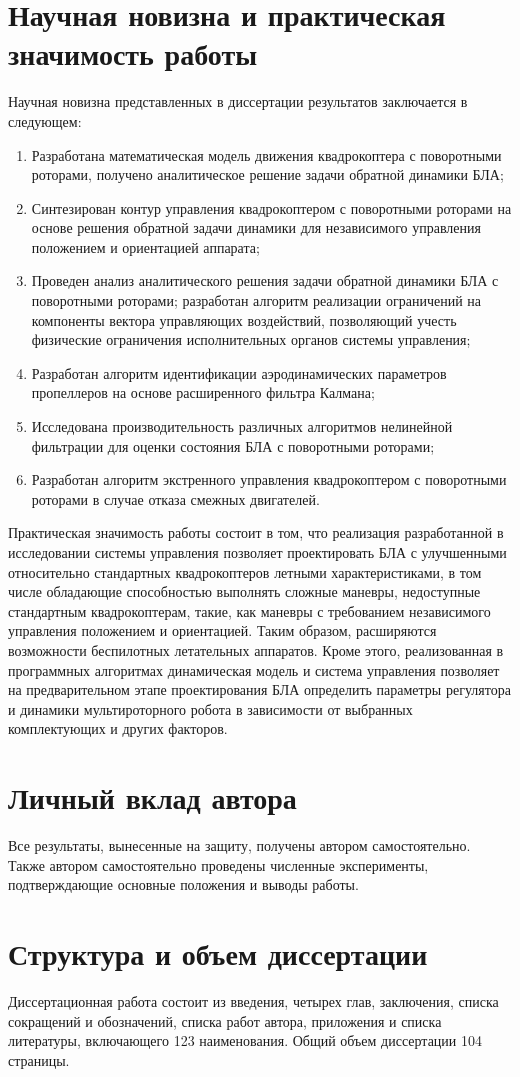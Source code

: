 \section{Научная новизна и практическая значимость работы}
Научная новизна представленных в диссертации результатов заключается в следующем:
\begin{enumerate}
	\item  Разработана математическая модель движения квадрокоптера с поворотными роторами, получено аналитическое решение задачи обратной динамики БЛА;
	\item Синтезирован контур управления квадрокоптером с поворотными роторами на основе решения обратной задачи динамики для независимого управления положением и ориентацией аппарата;
	\item  Проведен анализ аналитического решения задачи обратной динамики  БЛА с поворотными роторами; разработан алгоритм реализации ограничений на компоненты вектора управляющих воздействий, позволяющий учесть физические ограничения исполнительных органов системы управления;
	\item Разработан алгоритм идентификации аэродинамических параметров пропеллеров на основе расширенного фильтра Калмана;
	\item Исследована производительность различных алгоритмов нелинейной фильтрации для оценки состояния БЛА с поворотными роторами;
	\item Разработан алгоритм экстренного управления квадрокоптером с поворотными роторами в случае отказа  смежных двигателей.
\end{enumerate}

Практическая значимость работы состоит в том, что
реализация разработанной в исследовании системы управления позволяет проектировать БЛА с улучшенными относительно стандартных квадрокоптеров летными характеристиками, в том числе обладающие способностью 
выполнять сложные маневры, недоступные стандартным квадрокоптерам, такие, как маневры с требованием независимого управления положением и ориентацией.
Таким образом, расширяются возможности беспилотных летательных аппаратов.
Кроме этого, реализованная в программных алгоритмах динамическая модель и система управления позволяет на предварительном этапе проектирования БЛА определить параметры регулятора и динамики мультироторного робота в зависимости от выбранных комплектующих и других факторов.

\section{Личный вклад автора}
Все результаты, вынесенные на защиту, получены автором самостоятельно.
Также автором самостоятельно проведены численные эксперименты,
подтверждающие основные положения и выводы работы. 

\section{Структура и объем диссертации}
Диссертационная работа состоит из введения, четырех глав, заключения,
списка сокращений и обозначений, списка работ автора, приложения и списка литературы,
включающего 123 наименования.
Общий объем диссертации 104 страницы.












